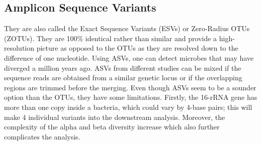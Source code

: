 \subsection{Amplicon Sequence Variants}
They are also called the Exact Sequence Variants (ESVs) or Zero-Radius OTUs (ZOTUs). They are 100\% identical rather than similar and provide a high-resolution picture as opposed to the OTUs as they are resolved down to the difference of one nucleotide. Using ASVs, one can detect microbes that may have diverged a million years ago. ASVs from different studies can be mixed if the sequence reads are obtained from a similar genetic locus or if the overlapping regions are trimmed before the merging. Even though ASVs seem to be a sounder option than the OTUs, they have some limitations. Firstly, the 16-rRNA gene has more than one copy inside a bacteria, which could vary by 4-base pairs; this will make 4 individual variants into the downstream analysis. Moreover, the complexity of the alpha and beta diversity increase which also further complicates the analysis.